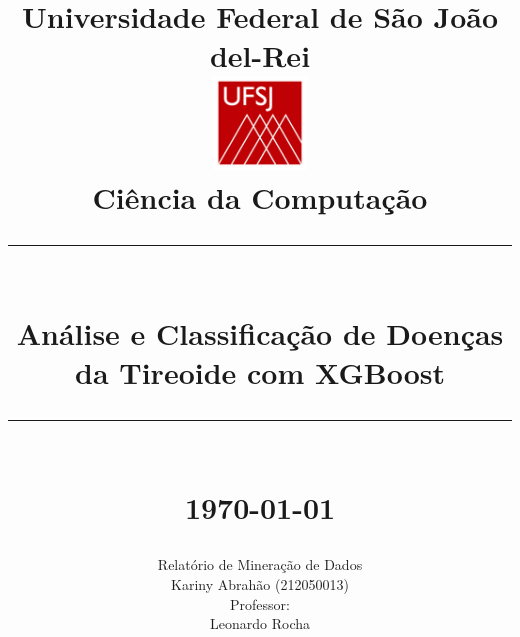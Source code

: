 \documentclass[11pt]{article}
\newcommand{\HRule}[1]{\rule{\linewidth}{#1}}
\begin{document}
\date{}

\title{ \normalsize Universidade Federal de São João del-Rei
		\\ [1.0cm]
		\includegraphics[width=25mm]{img/ufsjbr_logo.jpg}  \\[.5cm]
		\normalsize Ciência da Computação \\ [3.5cm]
		\HRule{2pt} \\
		\LARGE \textbf{Análise e Classificação de Doenças da Tireoide com XGBoost} %
		\HRule{2pt} \\ [0.5cm]
		\normalsize \today \vspace*{5\baselineskip}}
		
\date{}

\author{
        Relatório de Mineração de Dados \\[0.5cm]
		Kariny Abrahão (212050013)            \\[1cm]
		 Professor:        \\
		 Leonardo Rocha
		 }
		 
\maketitle

\newpage

\tableofcontents
\end{document}
